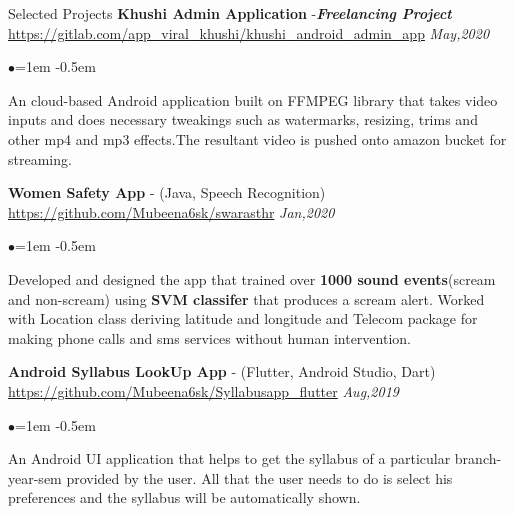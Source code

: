 \documentclass[8pt]{resume} %
\begin{document}
 \begin{rSection}{Selected Projects}
    {\bf Khushi Admin Application } -\emph{\bf Freelancing Project} {\scriptsize \url{https://gitlab.com/app_viral_khushi/khushi_android_admin_app}} \hfill{\em May,2020}
    \begin{list}{$\bullet$}{\leftmargin=1em}
    \itemsep -0.5em \vspace{-0.5em}
        \item An cloud-based Android application built on FFMPEG library that takes video inputs and does necessary tweakings such as watermarks, resizing, trims and other mp4 and mp3 effects.The resultant video is pushed onto amazon bucket for streaming.
    \end{list}


    {\bf Women Safety App} - (Java, Speech Recognition) {\scriptsize \url{https://github.com/Mubeena6sk/swarasthr}} \hfill {\em Jan,2020}
    \begin{list}{$\bullet$}{\leftmargin=1em}
    \itemsep -0.5em \vspace{-0.5em}
        \item  Developed and designed the app that trained over {\bf 1000 sound events}(scream and non-scream) using {\bf SVM classifer} that produces a scream alert. Worked with Location class deriving latitude and longitude and Telecom package for making phone calls and sms services without human intervention.
    \end{list}


    {\bf Android Syllabus LookUp App} - (Flutter, Android Studio, Dart){\scriptsize \url{ https://github.com/Mubeena6sk/Syllabusapp_flutter}} \hfill {\em Aug,2019}
    \begin{list}{$\bullet$}{\leftmargin=1em}
    \itemsep -0.5em \vspace{-0.5em}
        \item An Android UI application that helps to get the syllabus of a particular branch-year-sem
 provided by the user. All that the user needs to do is select his preferences and the syllabus will be automatically shown. 
    \end{list}
\end{rSection}


\end{document}
